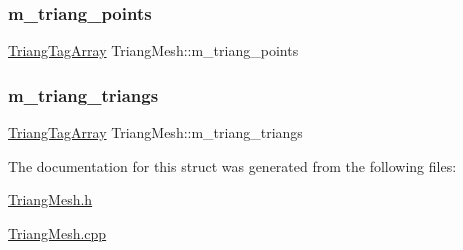 \mbox{\label{structTriangMesh_a47780d9e5f3c77c75a9d0c7c4b0b2fb4}} 
\subsubsection{\texorpdfstring{m\+\_\+triang\+\_\+points}{m\_triang\_points}}
{\footnotesize\ttfamily \hyperlink{TriangMesh_8h_a327fc0ebbe645527e422ebcea99b4cd3}{Triang\+Tag\+Array} Triang\+Mesh\+::m\+\_\+triang\+\_\+points\hspace{0.3cm}{\ttfamily [protected]}}

\mbox{\label{structTriangMesh_aa0f5b8d8a9c65af1c789051dd10e88b0}} 
\subsubsection{\texorpdfstring{m\+\_\+triang\+\_\+triangs}{m\_triang\_triangs}}
{\footnotesize\ttfamily \hyperlink{TriangMesh_8h_a327fc0ebbe645527e422ebcea99b4cd3}{Triang\+Tag\+Array} Triang\+Mesh\+::m\+\_\+triang\+\_\+triangs\hspace{0.3cm}{\ttfamily [protected]}}



The documentation for this struct was generated from the following files\+:\begin{DoxyCompactItemize}
\item 
\hyperlink{TriangMesh_8h}{Triang\+Mesh.\+h}\item 
\hyperlink{TriangMesh_8cpp}{Triang\+Mesh.\+cpp}\end{DoxyCompactItemize}
